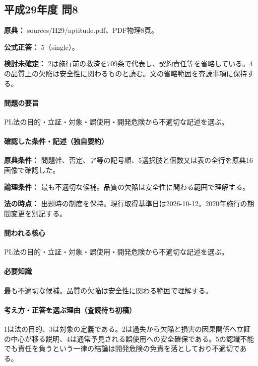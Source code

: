 \subsection{平成29年度 問8}
\label{q:h29-reg-apt-08}

\noindent\textbf{原典：} sources/H29/aptitude.pdf、PDF物理8頁。

\textbf{公式正答：} 5（single）。

\par\textbf{検討未確定：} 2は施行前の救済を709条で代表し、契約責任等を省略している。4の品質上の欠陥は安全性に関わるものと読む。文の省略範囲を査読事項に保持する。

\paragraph{問題の要旨} PL法の目的・立証・対象・誤使用・開発危険から不適切な記述を選ぶ。

\paragraph{確認した条件・記述（独自要約）}\mbox{}\par

\noindent\textbf{原典条件：} 問題幹、否定、ア等の記号順、5選択肢と個数又は表の全行を原典16画像で確認した。\par

\noindent\textbf{論理条件：} 最も不適切な候補。品質の欠陥は安全性に関わる範囲で理解する。\par

\noindent\textbf{法の時点：} 出題時の制度を保持。現行取得基準日は2026-10-12。2020年施行の期間変更を別記する。\par

\paragraph{問われる核心} PL法の目的・立証・対象・誤使用・開発危険から不適切な記述を選ぶ。

\paragraph{必要知識} 最も不適切な候補。品質の欠陥は安全性に関わる範囲で理解する。

\paragraph{考え方・正答を選ぶ理由（査読待ち初稿）} 1は法の目的、3は対象の定義である。2は過失から欠陥と損害の因果関係へ立証の中心が移る説明、4は通常予見される誤使用への安全確保である。5の認識不能でも責任を負うという一律の結論は開発危険の免責を落としており不適切である。


